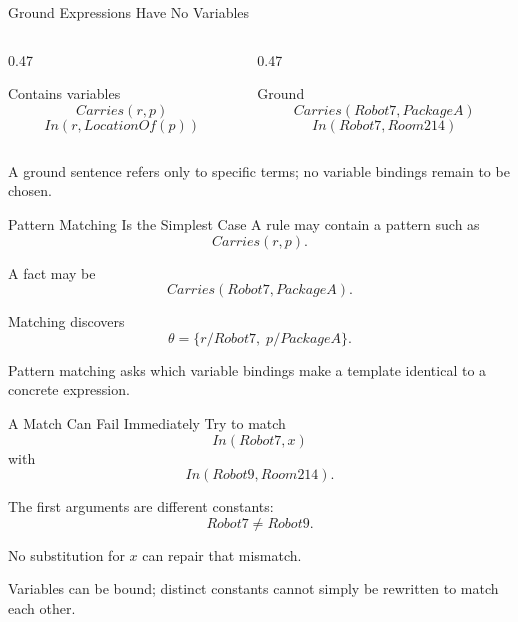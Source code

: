 \documentclass[aspectratio=169,10pt]{beamer}
\begin{document}
\begin{frame}[shrink=10]{Ground Expressions Have No Variables}
  \begin{columns}[T,onlytextwidth]
    \begin{column}{0.47\textwidth}
      \begin{block}{Contains variables}
        \[
          Carries(r,p)
        \]
        \[
          In(r,LocationOf(p))
        \]
      \end{block}
    \end{column}
    \begin{column}{0.47\textwidth}
      \begin{block}{Ground}
        \[
          Carries(Robot7,PackageA)
        \]
        \[
          In(Robot7,Room214)
        \]
      \end{block}
    \end{column}
  \end{columns}

  \begin{keyidea}
    A ground sentence refers only to specific terms; no variable bindings remain to be chosen.
  \end{keyidea}
\end{frame}

\begin{frame}[shrink=10]{Pattern Matching Is the Simplest Case}
  A rule may contain a pattern such as
  \[
    Carries(r,p).
  \]

  A fact may be
  \[
    Carries(Robot7,PackageA).
  \]

  Matching discovers
  \[
    \theta = \{r/Robot7,\;p/PackageA\}.
  \]

  \begin{keyidea}
    Pattern matching asks which variable bindings make a template identical to a concrete expression.
  \end{keyidea}
\end{frame}

\begin{frame}[shrink=10]{A Match Can Fail Immediately}
  Try to match
  \[
    In(Robot7,x)
  \]
  with
  \[
    In(Robot9,Room214).
  \]

  The first arguments are different constants:
  \[
    Robot7 \neq Robot9.
  \]

  No substitution for $x$ can repair that mismatch.

  \begin{keyidea}
    Variables can be bound; distinct constants cannot simply be rewritten to match each other.
  \end{keyidea}
\end{frame}
\end{document}
